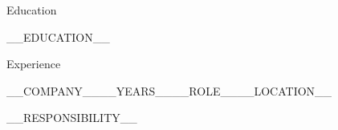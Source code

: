 \documentclass{resume}
\begin{document}
\begin{rSection}{Education}
  \item __EDUCATION__
\end{rSection}

\begin{rSection}{Experience}
  \begin{rSubsection}{__COMPANY__}{__YEARS__}{__ROLE__}{__LOCATION__}
    \item __RESPONSIBILITY__
  \end{rSubsection}
\end{rSection}
\end{document}
